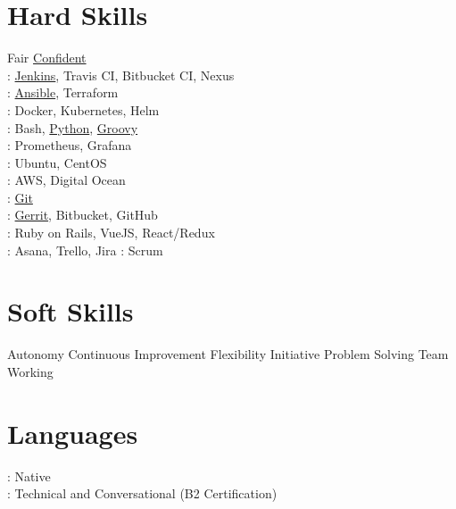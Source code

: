 \documentclass[]{deedy-resume-openfont}
\begin{document}
\begin{minipage}[t]{0.33\textwidth}
\section{Hard Skills}
Fair \textbullet{} \underline{Confident}\\
: \underline{Jenkins}, Travis CI, Bitbucket CI, Nexus\\
: \underline{Ansible}, Terraform \\
: Docker, Kubernetes, Helm \\
: Bash, \underline{Python}, \underline{Groovy} \\
: Prometheus, Grafana \\
: Ubuntu, CentOS \\
: AWS, Digital Ocean \\
: \underline{Git}\\
: \underline{Gerrit}, Bitbucket, GitHub\\
: Ruby on Rails, VueJS, React/Redux\\
: Asana, Trello, Jira
: Scrum

\section{Soft Skills}
Autonomy \textbullet{} Continuous Improvement \textbullet{} Flexibility \textbullet{}
Initiative \textbullet{} Problem Solving \textbullet{} Team Working
\section{Languages}
: Native\\
: Technical and Conversational (B2 Certification)
\sectionsep

%
%

\end{minipage} 
\vline
\hspace{0.01\textwidth}
\end{document}
